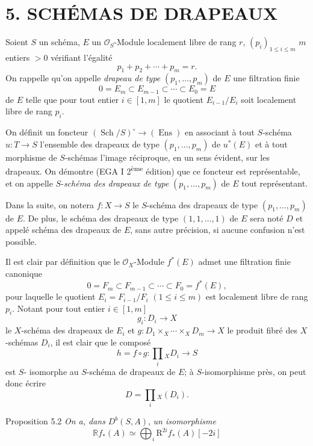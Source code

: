 \section*{5. SCHÉMAS DE DRAPEAUX}

Soient $S$ un schéma, $E$ un $\mathcal{O}_S$-Module localement libre de rang $r$, $(p_i)_{1\le i\le m}$ $m$ entiers $>0$ vérifiant l'égalité
\[
p_1+p_2+\cdots+p_m=r.
\]
On rappelle qu'on appelle \emph{drapeau de type} $(p_1,\ldots,p_m)$ de $E$ une filtration finie
\[
0=E_m\subset E_{m-1}\subset\cdots\subset E_0=E
\]
de $E$ telle que pour tout entier $i\in[1,m]$ le quotient $E_{i-1}/E_i$ soit localement libre de rang $p_i$.

On définit un foncteur $(\operatorname{Sch}/S)^\circ\to(\operatorname{Ens})$ en associant à tout $S$-schéma $u:T\to S$ l'ensemble des drapeaux de type $(p_1,\ldots,p_m)$ de $u^*(E)$ et à tout morphisme de $S$-schémas l'image réciproque, en un sens évident, sur les drapeaux. On démontre (EGA I 2\textsuperscript{ème} édition) que ce foncteur est représentable, et on appelle $S$-\emph{schéma des drapeaux de type} $(p_1,\ldots,p_m)$ de $E$ tout représentant.

Dans la suite, on notera $f:X\to S$ le $S$-schéma des drapeaux de type $(p_1,\ldots,p_m)$ de $E$. De plus, le schéma des drapeaux de type $(1,1,\ldots,1)$ de $E$ sera noté $D$ et appelé schéma des drapeaux de $E$, sans autre précision, si aucune confusion n'est possible.

Il est clair par définition que le $\mathcal{O}_X$-Module $f^*(E)$ admet une filtration finie canonique
\[
0=F_m\subset F_{m-1}\subset\cdots\subset F_0=f^*(E),
\]
pour laquelle le quotient $E_i=F_{i-1}/F_i$ $(1\le i\le m)$ est localement libre de rang $p_i$. Notant pour tout entier $i\in[1,m]$
\[
g_i:D_i\to X
\]
le $X$-schéma des drapeaux de $E_i$ et $g:D_1\times_X\cdots\times_X D_m\to X$ le produit fibré des $X$-schémas $D_i$, il est clair que le composé
\[
h=f\circ g:\prod_i{}_XD_i\to S
\tag{5.1}
\]
est $S$-
isomorphe au $S$-schéma de drapeaux de $E$; à $S$-isomorphisme près, on peut donc écrire
\[
D=\prod_i{}_X(D_i).
\]

\begin{statement}{Proposition 5.2}
\emph{On a, dans} $D^b(S,A)$, \emph{un isomorphisme}
\[
\mathbb{R} f_*(A)\simeq\bigoplus_i \mathrm{R}^{2i}f_*(A)[-2i]
\]
\end{statement}

